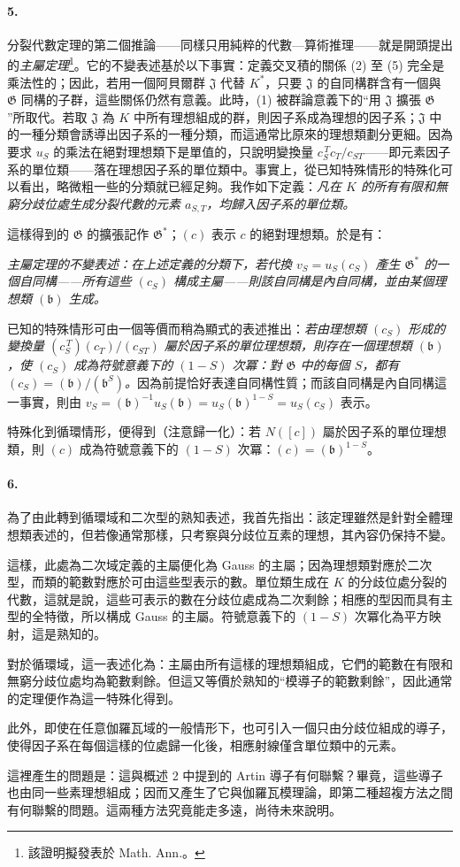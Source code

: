 \documentclass[11pt]{article}
\providecommand{\Gg}{\mathfrak G}
\begin{document}
\paragraph{5.}
分裂代數定理的第二個推論——同樣只用純粹的代數—算術推理——就是開頭提出的\emph{主屬定理}\footnote{該證明擬發表於 Math. Ann.。}。它的不變表述基於以下事實：定義交叉積的關係 (2) 至 (5) 完全是乘法性的；因此，若用一個阿貝爾群 \(\mathfrak J\) 代替 \(K^\ast\)，只要 \(\mathfrak J\) 的自同構群含有一個與 \(\Gg\) 同構的子群，這些關係仍然有意義。此時，(1) 被群論意義下的“用 \(\mathfrak J\) 擴張 \(\Gg\)”所取代。若取 \(\mathfrak J\) 為 \(K\) 中所有理想組成的群，則因子系成為理想的因子系；\(\mathfrak J\) 中的一種分類會誘導出因子系的一種分類，而這通常比原來的理想類劃分更細。因為要求 \(u_S\) 的乘法在絕對理想類下是單值的，只說明變換量 \(c_S^{\,T}c_T/c_{ST}\)——即元素因子系的單位類——落在理想因子系的單位類中。事實上，從已知特殊情形的特殊化可以看出，略微粗一些的分類就已經足夠。我作如下定義：\emph{凡在 \(K\) 的所有有限和無窮分歧位處生成分裂代數的元素 \(a_{S,T}\)，均歸入因子系的單位類。}

這樣得到的 \(\Gg\) 的擴張記作 \(\Gg^\ast\)；\((c)\) 表示 \(c\) 的絕對理想類。於是有：

\emph{主屬定理的不變表述：在上述定義的分類下，若代換 \(v_S=u_S(c_S)\) 產生 \(\Gg^\ast\) 的一個自同構——所有這些 \((c_S)\) 構成主屬——則該自同構是內自同構，並由某個理想類 \((\mathfrak b)\) 生成。}

已知的特殊情形可由一個等價而稍為顯式的表述推出：\emph{若由理想類 \((c_S)\) 形成的變換量 \((c_S^{\,T})(c_T)/(c_{ST})\) 屬於因子系的單位理想類，則存在一個理想類 \((\mathfrak b)\)，使 \((c_S)\) 成為符號意義下的 \((1-S)\) 次冪：對 \(\Gg\) 中的每個 \(S\)，都有 \((c_S)=(\mathfrak b)/(\mathfrak b^{S})\)。}因為前提恰好表達自同構性質；而該自同構是內自同構這一事實，則由 \(v_S=(\mathfrak b)^{-1}u_S(\mathfrak b)=u_S(\mathfrak b)^{1-S}=u_S(c_S)\) 表示。

特殊化到循環情形，便得到（注意歸一化）：若 \(N([c])\) 屬於因子系的單位理想類，則 \((c)\) 成為符號意義下的 \((1-S)\) 次冪：\((c)=(\mathfrak b)^{1-S}\)。

\paragraph{6.}
為了由此轉到循環域和二次型的熟知表述，我首先指出：該定理雖然是針對全體理想類表述的，但若像通常那樣，只考察與分歧位互素的理想，其內容仍保持不變。

這樣，此處為二次域定義的主屬便化為 Gauss 的主屬；因為理想類對應於二次型，而類的範數對應於可由這些型表示的數。單位類生成在 \(K\) 的分歧位處分裂的代數，這就是說，這些可表示的數在分歧位處成為二次剩餘；相應的型因而具有主型的全特徵，所以構成 Gauss 的主屬。符號意義下的 \((1-S)\) 次冪化為平方映射，這是熟知的。

對於循環域，這一表述化為：主屬由所有這樣的理想類組成，它們的範數在有限和無窮分歧位處均為範數剩餘。但這又等價於熟知的“模導子的範數剩餘”，因此通常的定理便作為這一特殊化得到。

此外，即使在任意伽羅瓦域的一般情形下，也可引入一個只由分歧位組成的導子，使得因子系在每個這樣的位處歸一化後，相應射線僅含單位類中的元素。

這裡產生的問題是：這與概述 2 中提到的 Artin 導子有何聯繫？畢竟，這些導子也由同一些素理想組成；因而又產生了它與伽羅瓦模理論，即第二種超複方法之間有何聯繫的問題。這兩種方法究竟能走多遠，尚待未來說明。
\end{document}

